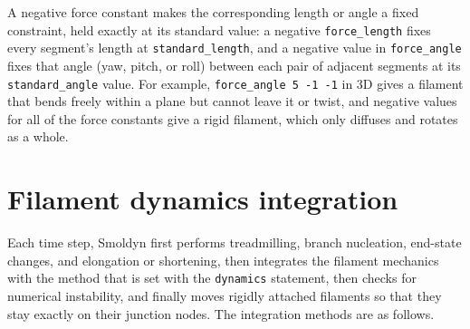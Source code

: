 \documentclass {scrbook}
\newcommand {\ttt} {\texttt}
\begin{document}
A negative force constant makes the corresponding length or angle a fixed constraint, held exactly at its standard value: a negative \ttt{force\_length} fixes every segment's length at \ttt{standard\_length}, and a negative value in \ttt{force\_angle} fixes that angle (yaw, pitch, or roll) between each pair of adjacent segments at its \ttt{standard\_angle} value. For example, \ttt{force\_angle 5 -1 -1} in 3D gives a filament that bends freely within a plane but cannot leave it or twist, and negative values for all of the force constants give a rigid filament, which only diffuses and rotates as a whole.

\section{Filament dynamics integration}

Each time step, Smoldyn first performs treadmilling, branch nucleation, end-state changes, and elongation or shortening, then integrates the filament mechanics with the method that is set with the \ttt{dynamics} statement, then checks for numerical instability, and finally moves rigidly attached filaments so that they stay exactly on their junction nodes. The integration methods are as follows.
\end{document}
